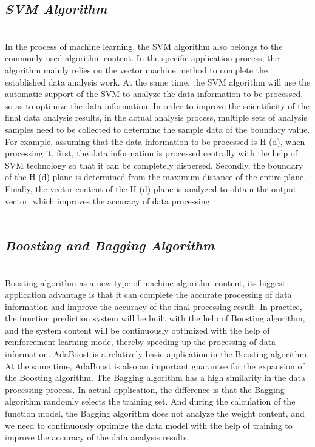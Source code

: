 \documentclass{article}
\begin{document}
\subsection{\emph{SVM Algorithm}}\\
In the process of machine learning, the SVM algorithm also belongs to the commonly used algorithm 
content. In the specific application process, the algorithm mainly relies on the vector machine method 
to complete the established data analysis work. At the same time, the SVM algorithm will use the 
automatic support of the SVM to analyze the data information to be processed, so as to optimize the 
data information. In order to improve the scientificity of the final data analysis results, in the actual 
analysis process, multiple sets of analysis samples need to be collected to determine the sample data of 
the boundary value. For example, assuming that the data information to be processed is H (d), when 
processing it, first, the data information is processed centrally with the help of SVM technology so that 
it can be completely dispersed. Secondly, the boundary of the H (d) plane is determined from the 
maximum distance of the entire plane. Finally, the vector content of the H (d) plane is analyzed to 
obtain the output vector, which improves the accuracy of data processing.
\\\\
\subsection{\emph{Boosting and Bagging Algorithm}}\\
Boosting algorithm as a new type of machine algorithm content, its biggest application advantage is 
that it can complete the accurate processing of data information and improve the accuracy of the final 
processing result. In practice, the function prediction system will be built with the help of Boosting 
algorithm, and the system content will be continuously optimized with the help of reinforcement 
learning mode, thereby speeding up the processing of data information. AdaBoost is a relatively basic 
application in the Boosting algorithm. At the same time, AdaBoost is also an important guarantee for 
the expansion of the Boosting algorithm. The Bagging algorithm has a high similarity in the data 
processing process. In actual application, the difference is that the Bagging algorithm randomly selects 
the training set. And during the calculation of the function model, the Bagging algorithm does not 
analyze the weight content, and we need to continuously optimize the data model with the help of 
training to improve the accuracy of the data analysis results.
\\\\
\end{document}
